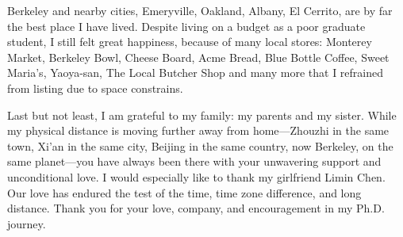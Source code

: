 \documentclass[thesis.tex]{subfiles}
\begin{document}
\begin{acknowledgements}
  Berkeley and nearby cities, Emeryville, Oakland, Albany, El Cerrito, are by
  far the best place I have lived. Despite living on a budget as a poor graduate
  student, I still felt great happiness, because of many local stores: Monterey
  Market, Berkeley Bowl, Cheese Board, Acme Bread, Blue Bottle Coffee, Sweet
  Maria's, Yaoya-san, The Local Butcher Shop and many more that I refrained from
  listing due to space constrains.

  Last but not least, I am grateful to my family: my parents and my
  sister. While my physical distance is moving further away from home---Zhouzhi
  in the same town, Xi'an in the same city, Beijing in the same country, now
  Berkeley, on the same planet---you have always been there with your unwavering
  support and unconditional love. I would especially like to thank my girlfriend
  Limin Chen. Our love has endured the test of the time, time zone difference,
  and long distance. Thank you for your love, company, and encouragement in my
  Ph.D. journey.

\end{acknowledgements}
\end{document}
